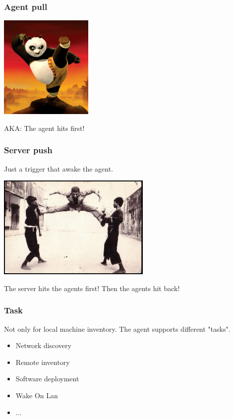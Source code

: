 \begin{frame}
    \frametitle{Agent pull}


    \includegraphics[height=5.0cm]{pics/kung-fu-panda.jpg}


    AKA: The agent hits first!

\end{frame}

\begin{frame}
    \frametitle{Server push}

    Just a trigger that awake the agent.


    \includegraphics[height=5.0cm]{pics/double-kick.jpg}

    The server hits the agents first! Then the agents hit back!

\end{frame}

\begin{frame}
    \frametitle{Task}
    Not only for local machine inventory. The agent supports different "tasks".

    \pause
    \begin{itemize}

        \item Network discovery
        \item Remote inventory
        \item Software deployment
        \item Wake On Lan
        \item ...
    \end{itemize}
\end{frame}

